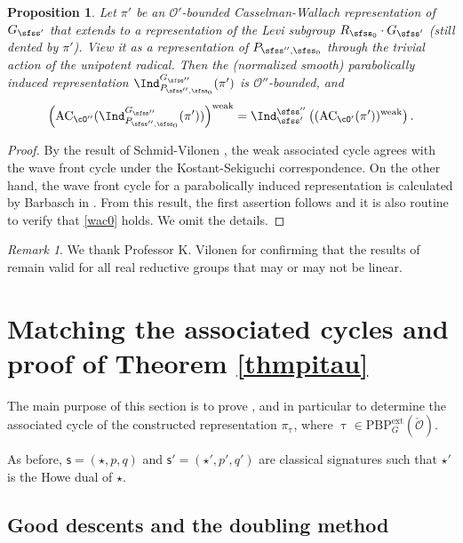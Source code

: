 \documentclass[11pt,a4paper]{amsart}
\newcommand{\AC}{\mathrm{AC}}
\newcommand{\CO}{{\mathcal {O}}}
\newcommand{\be}{\begin {equation}}
\newcommand{\ee}{\end {equation}}
\numberwithin{equation}{section}
\newtheorem{prop}[thm]{Proposition}
\theoremstyle{remark}
\newtheorem*{remark}{Remark}
\def\PBP{\mathrm{PBP}}
\def\AC{\mathrm{AC}}
\begin{document}
\begin{prop}\label{lem:ind00}
Let $\pi'$ be an $\CO'$-bounded Casselman-Wallach representation of $G_{\sfss'}$ that extends to a representation of the Levi subgroup $R_{\sfss_0}\cdot G_{\sfss'}$ (still dented by $\pi'$). View it  as a representation of $P_{\sfss'',\sfss_0}$ through the trivial action of the unipotent radical. Then the (normalized smooth) parabolically induced representation $\Ind_{P_{\sfss'',\sfss_0}}^{G_{\sfss''}} (\pi')$ is $\CO''$-bounded, and
\be\label{wac0}
 \left( \AC_{\cO''}(\Ind_{P_{\sfss'',\sfss_0}}^{G_{\sfss''}} (\pi'))\right)^{\mathrm{weak}} = \Ind_{\sfss'}^{\sfss''}\left( (\AC_{\cO'}(\pi'))^{\mathrm{weak}}\right).
\ee
\end{prop}

\begin{proof}
By the result of Schmid-Vilonen \cite{SV},  the weak associated cycle agrees with the wave
front cycle under the Kostant-Sekiguchi
correspondence. On the other hand, the  wave
front cycle for a parabolically induced representation is calculated by Barbasch in {\cite[Corollary~5.0.10]{B.Orbit}}. From this result, the first assertion follows and it is also routine to verify that
\eqref{wac0} holds. We omit the details.
\end{proof}

\begin{remark} We thank Professor K. Vilonen for confirming that the results of \cite{SV} remain valid for all real reductive groups that may or may not be linear.%
\end{remark}


\section{Matching the associated  cycles and proof of Theorem \ref{thmpitau}}\label{sec:equac}

The main purpose of this section is to prove , and in particular to determine the associated cycle of the constructed representation $\pi _{\uptau}$, where
$\uptau \in \mathrm{\PBP}^{\mathrm{ext}}_{G}(\check \CO)$.

As before, $\mathsf s=(\star, p,q)$ and $ \mathsf s'=(\star', p',q')$ are classical signatures such that $\star'$ is the Howe dual of $\star$.


\subsection{Good descents and the doubling method}\label{subsec:gdescent}
\end{document}
